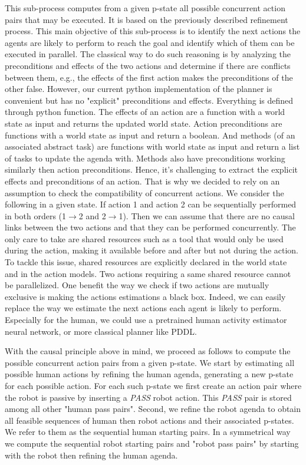 This sub-process computes from a given p-state all possible concurrent action pairs that may be executed. It is based on the previously described refinement process. This main objective of this sub-process is to identify the next actions the agents are likely to perform to reach the goal and identify which of them can be executed in parallel. The classical way to do such reasoning is by analyzing the preconditions and effects of the two actions and determine if there are conflicts between them, e.g., the effects of the first action makes the preconditions of the other false.
However, our current python implementation of the planner is convenient but has no "explicit" preconditions and effects. Everything is defined through python function. The effects of an action are a function with a world state as input and returns the updated world state. Action preconditions are functions with a world state as input and return a boolean. And methods (of an associated abstract task) are functions with world state as input and return a list of tasks to update the agenda with. Methods also have preconditions working similarly then action preconditions. 
Hence, it's challenging to extract the explicit effects and preconditions of an action. That is why we decided to rely on an assumption to check the compatibility of concurrent actions. 
We consider the following in a given state. 
If action 1 and action 2 can be sequentially performed in both orders (1$\rightarrow$2 and 2$\rightarrow$1). Then we can assume that there are no causal links between the two actions and that they can be performed concurrently. The only care to take are shared resources such as a tool that would only be used during the action, making it available before and after but not during the action. To tackle this issue, shared resources are explicitly declared in the world state and in the action models. Two actions requiring a same shared resource cannot be parallelized.
One benefit the way we check if two actions are mutually exclusive is making the actions estimations a black box. Indeed, we can easily replace the way we estimate the next actions each agent is likely to perform. Especially for the human, we could use a pretrained human activity estimator neural network, or more classical planner like PDDL. 

With the causal principle above in mind, we proceed as follows to compute the possible concurrent action pairs from a given p-state. We start by estimating all possible human actions by refining the human agenda, generating a new p-state for each possible action. For each such p-state we first create an action pair where the robot is passive by inserting a \textit{PASS} robot action. This \textit{PASS} pair is stored among all other "human pass pairs". Second, we refine the robot agenda to obtain all feasible sequences of human then robot actions and their associated p-states. We refer to them as the sequential human starting pairs. In a symmetrical way we compute the sequential robot starting pairs and "robot pass pairs" by starting with the robot then refining the human agenda.

